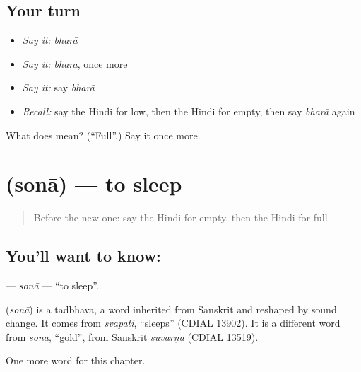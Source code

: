 \subsection*{Your turn}
\begin{itemize}
\raggedright
  \item \emph{Say it:} \emph{bharā}
  \item \emph{Say it:} \emph{bharā}, once more
  \item \emph{Say it:} say \emph{bharā}
  \item \emph{Recall:} say the Hindi for low, then the Hindi for empty, then say \emph{bharā} again
\end{itemize}

\begin{tcolorbox}[breakable,colback=teal!4,colframe=teal!35!black,title={Before you move on}]
What does  mean? (\textquotedblleft{}Full\textquotedblright{}.) Say it once more.
\end{tcolorbox}
\section[\texorpdfstring{\hi{सोना} (sonā)}{सोना (sonā)}]{ (sonā) — to sleep}

\label{lesson:HI-C159-sona}



\begin{quote}
Before the new one: say the Hindi for empty, then the Hindi for full.
\end{quote}

\subsection*{You'll want to know: }
\textbf{} — \emph{sonā} — \textquotedblleft{}to sleep\textquotedblright{}.

\begin{cousinweb}
\textbf{} (\emph{sonā}) is a tadbhava, a word inherited from Sanskrit and reshaped by sound change. It comes from \emph{svapati}, \textquotedblleft{}sleeps\textquotedblright{} (CDIAL 13902). It is a different word from \emph{sonā}, \textquotedblleft{}gold\textquotedblright{}, from Sanskrit \emph{suvarṇa} (CDIAL 13519).
\end{cousinweb}

\begin{grammarlens}[title={What you've built}]
One more word for this chapter.
\end{grammarlens}

